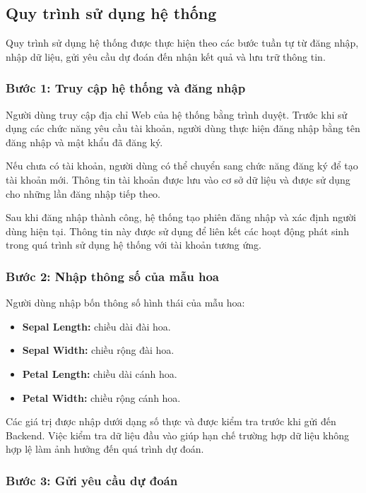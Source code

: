 \documentclass[14pt]{extarticle}
\begin{document}
	\subsection{Quy trình sử dụng hệ thống}
	
	\noindent Quy trình sử dụng hệ thống được thực hiện theo các bước tuần tự từ đăng nhập, nhập dữ liệu, gửi yêu cầu dự đoán đến nhận kết quả và lưu trữ thông tin.
	
	\subsubsection*{Bước 1: Truy cập hệ thống và đăng nhập}
	
	\noindent Người dùng truy cập địa chỉ Web của hệ thống bằng trình duyệt. Trước khi sử dụng các chức năng yêu cầu tài khoản, người dùng thực hiện đăng nhập bằng tên đăng nhập và mật khẩu đã đăng ký.
	
	\noindent Nếu chưa có tài khoản, người dùng có thể chuyển sang chức năng đăng ký để tạo tài khoản mới. Thông tin tài khoản được lưu vào cơ sở dữ liệu và được sử dụng cho những lần đăng nhập tiếp theo.
	
	\noindent Sau khi đăng nhập thành công, hệ thống tạo phiên đăng nhập và xác định người dùng hiện tại. Thông tin này được sử dụng để liên kết các hoạt động phát sinh trong quá trình sử dụng hệ thống với tài khoản tương ứng.
	
	\subsubsection*{Bước 2: Nhập thông số của mẫu hoa}
	
	\noindent Người dùng nhập bốn thông số hình thái của mẫu hoa:
	
	\begin{itemize}[leftmargin=*]
		\item \textbf{Sepal Length:} chiều dài đài hoa.
		\item \textbf{Sepal Width:} chiều rộng đài hoa.
		\item \textbf{Petal Length:} chiều dài cánh hoa.
		\item \textbf{Petal Width:} chiều rộng cánh hoa.
	\end{itemize}
	
	\noindent Các giá trị được nhập dưới dạng số thực và được kiểm tra trước khi gửi đến Backend. Việc kiểm tra dữ liệu đầu vào giúp hạn chế trường hợp dữ liệu không hợp lệ làm ảnh hưởng đến quá trình dự đoán.
	
	\subsubsection*{Bước 3: Gửi yêu cầu dự đoán}
	
\end{document}
